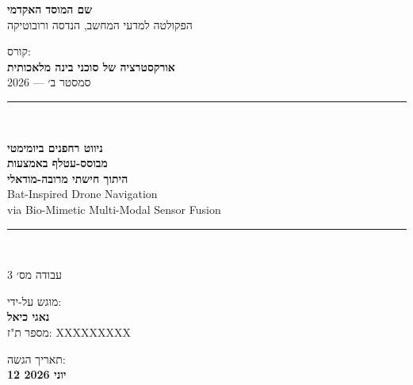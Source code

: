 \begin{titlepage}
    \centering
    \vspace*{1.5cm}

    {\large\textbf{שם המוסד האקדמי}}\\
    \vspace{0.3em}
    {\normalsize הפקולטה למדעי המחשב, הנדסה ורובוטיקה}\\
    \vspace{1.5cm}

    {\normalsize קורס:}\\
    \vspace{0.2em}
    {\large\textbf{אורקסטרציה של סוכני בינה מלאכותית}}\\
    \vspace{0.2em}
    {\normalsize סמסטר ב׳ --- 2026}\\
    \vspace{1.5cm}

    \rule{\linewidth}{1pt}\\
    \vspace{0.5cm}

    {\LARGE\bfseries
        ניווט רחפנים ביומימטי\\
        \vspace{0.4em}
        מבוסס-עטלף באמצעות\\
        \vspace{0.4em}
        היתוך חישתי מרובה-מודאלי
    }\\
    \vspace{0.4em}
    {\large\foreignlanguage{english}{%
        Bat-Inspired Drone Navigation\\
        \vspace{0.2em}
        via Bio-Mimetic Multi-Modal Sensor Fusion%
    }}\\
    \vspace{0.3em}

    \rule{\linewidth}{1pt}\\
    \vspace{1.5cm}

    {\large עבודה מס׳ 3}\\
    \vspace{2cm}

    {\normalsize מוגש על-ידי:}\\
    \vspace{0.5em}
    {\large\textbf{נאגי כיאל}}\\
    \vspace{0.2em}
    {\normalsize מספר ת"ז: XXXXXXXXX}\\
    \vspace{1cm}

    \vfill
    {\normalsize תאריך הגשה:}\\
    \vspace{0.2em}
    {\large\textbf{12 יוני 2026}}\\
    \vspace{1cm}
\end{titlepage}
